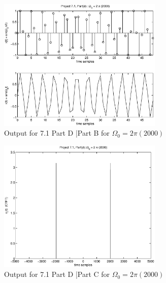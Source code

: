 \begin{figure}[!htbp]
  \centering
    \includegraphics[width=0.7\textwidth]{Part1/Output/Figures/proj71PartD3.eps}
  \caption{Output for 7.1 Part D |Part B for $\Omega_0 = 2\pi(2000)$ }
\end{figure}

\begin{figure}[!htbp]
  \centering
    \includegraphics[width=0.7\textwidth]{Part1/Output/Figures/proj71PartD4.eps}
  \caption{Output for 7.1 Part D |Part C for $\Omega_0 = 2\pi(2000)$ }
\end{figure}

\pagebreak
